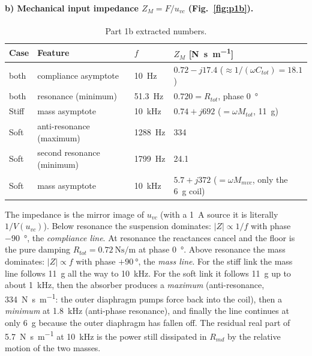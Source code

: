 \documentclass[a4paper,11pt]{article}
\begin{document}
\paragraph{b) Mechanical input impedance $Z_M = F/u_{vc}$ (Fig.~\ref{fig:p1b}).}
\begin{table}[H]\centering\small
\begin{tabular}{@{}llll@{}}\toprule
Case & Feature & $f$ & $Z_M$ [\si{\newton\second\per\metre}] \\ \midrule
both & compliance asymptote & \SI{10}{\hertz} & $0.72 - j17.4$ ($\approx 1/(\omega C_{tot}) = 18.1$) \\
both & resonance (minimum) & \SI{51.3}{\hertz} & $0.720 = R_{tot}$, phase \SI{0}{\degree} \\
Stiff & mass asymptote & \SI{10}{\kilo\hertz} & $0.74 + j692$ ($=\omega M_{tot}$, \SI{11}{\gram}) \\
Soft & anti-resonance (maximum) & \SI{1288}{\hertz} & 334 \\
Soft & second resonance (minimum) & \SI{1799}{\hertz} & 24.1 \\
Soft & mass asymptote & \SI{10}{\kilo\hertz} & $5.7 + j372$ ($=\omega M_{mvc}$, only the \SI{6}{\gram} coil) \\
\bottomrule\end{tabular}
\caption{Part 1b extracted numbers.}
\end{table}

The impedance is the mirror image of $u_{vc}$ (with a \SI{1}{\ampere} source it is literally $1/V(u_{vc})$). Below
resonance the suspension dominates: $|Z|\propto 1/f$ with phase \SI{-90}{\degree}, the \emph{compliance line}. At
resonance the reactances cancel and the floor is the pure damping $R_{tot} = \SI{0.72}{\newton\second\per\metre}$ at
phase \SI{0}{\degree}. Above resonance the mass dominates: $|Z|\propto f$ with phase $+\SI{90}{\degree}$, the
\emph{mass line}. For the stiff link the mass line follows \SI{11}{\gram} all the way to \SI{10}{\kilo\hertz}. For the
soft link it follows \SI{11}{\gram} up to about \SI{1}{\kilo\hertz}, then the absorber produces a \emph{maximum}
(anti-resonance, \SI{334}{\newton\second\per\metre}: the outer diaphragm pumps force back into the coil), then a
\emph{minimum} at \SI{1.8}{\kilo\hertz} (anti-phase resonance), and finally the line continues at only \SI{6}{\gram}
because the outer diaphragm has fallen off. The residual real part of \SI{5.7}{\newton\second\per\metre} at
\SI{10}{\kilo\hertz} is the power still dissipated in $R_{md}$ by the relative motion of the two masses.
\end{document}
